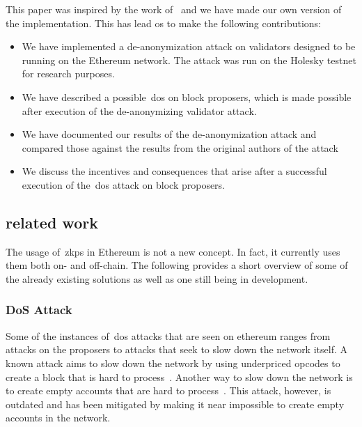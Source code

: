 This paper was inspired by the work of~\cite{heimbach2024deanonymizingethereumvalidatorsp2p} and we have made our own version of the implementation.
This has lead os to make the following contributions:
\begin{itemize}
    \item We have implemented a de-anonymization attack on validators designed to be running on the Ethereum network.
    The attack was run on the Holesky testnet for research purposes.
    \item We have described a possible~\gls{dos} on block proposers, which is made possible after execution of the de-anonymizing validator attack.
    \item We have documented our results of the de-anonymization attack and compared those against the results from the original authors of the attack~\cite{heimbach2024deanonymizingethereumvalidatorsp2p}
    \item We discuss the incentives and consequences that arise after a successful execution of the~\gls{dos} attack on block proposers.
\end{itemize}

\subsection{related work}\label{subsec:related-work}
The usage of~\glspl{zkp} in Ethereum is not a new concept.
In fact, it currently uses them both on- and off-chain.
The following provides a short overview of some of the already existing solutions as well as one still being in development.


\subsubsection{DoS Attack}\label{subsubsec:dos-attack}
Some of the instances of~\gls{dos} attacks that are seen on ethereum ranges from attacks on the proposers to attacks that seek to slow down the network itself.
A known attack aims to slow down the network by using underpriced opcodes to create a block that is hard to process~\cite{10.1145/3391195,9815256}.
Another way to slow down the network is to create empty accounts that are hard to process~\cite{empty-account-mitigation,empty-account-eip-mitigation}.
This attack, however, is outdated and has been mitigated by making it near impossible to create empty accounts in the network.

